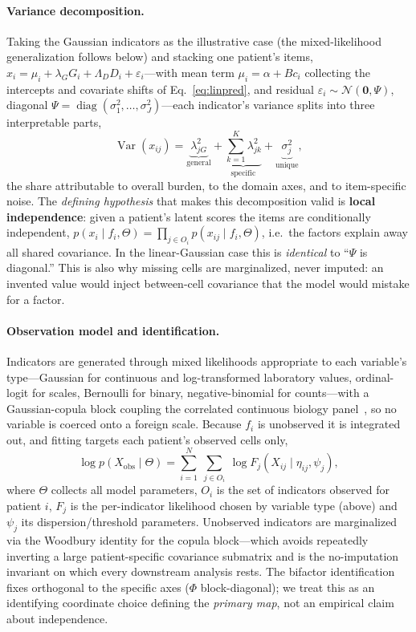 \paragraph{Variance decomposition.} Taking the Gaussian indicators as the illustrative case (the
mixed-likelihood generalization follows below) and stacking one patient's items, $x_i=\mu_i+\lambda_G
G_i+\Lambda_D D_i+\varepsilon_i$---with mean term $\mu_i=\alpha+Bc_i$ collecting the intercepts and
covariate shifts of Eq.~\ref{eq:linpred}, and residual $\varepsilon_i\sim\mathcal N(\mathbf 0,\Psi)$,
diagonal $\Psi=\operatorname{diag}(\sigma_1^2,\dots,\sigma_J^2)$---each indicator's variance splits into
three interpretable parts,
\begin{equation}
\operatorname{Var}(x_{ij})=\underbrace{\lambda_{jG}^{2}}_{\text{general}}
+\underbrace{\textstyle\sum_{k=1}^{K}\lambda_{jk}^{2}}_{\text{specific}}
+\underbrace{\sigma_j^{2}}_{\text{unique}} ,
\label{eq:vardecomp}
\end{equation}
the share attributable to overall burden, to the domain axes, and to item-specific noise. The
\emph{defining hypothesis} that makes this decomposition valid is \textbf{local independence}: given a
patient's latent scores the items are conditionally independent,
$p(x_i\mid f_i,\Theta)=\prod_{j\in O_i}p(x_{ij}\mid f_i,\Theta)$, i.e.\ the factors explain away all
shared covariance. In the linear-Gaussian case this is \emph{identical} to ``$\Psi$ is diagonal.''
This is also why missing cells are marginalized, never imputed: an invented value would inject
between-cell covariance that the model would mistake for a factor.

\paragraph{Observation model and identification.} Indicators are generated through mixed likelihoods
appropriate to each variable's type---Gaussian for continuous and log-transformed laboratory values,
ordinal-logit for scales, Bernoulli for binary, negative-binomial for counts---with a Gaussian-copula
block coupling the correlated continuous biology panel~\citep{hui2017gllvm}, so no variable is coerced
onto a foreign scale. Because $f_i$ is unobserved it is integrated out, and fitting targets each
patient's observed cells only,
\begin{equation}
\log p\!\left(X_{\mathrm{obs}}\mid\Theta\right)=\sum_{i=1}^{N}\ \sum_{j\in O_i}\
\log F_j\!\left(X_{ij}\mid\eta_{ij},\psi_j\right),
\label{eq:obslik}
\end{equation}
where $\Theta$ collects all model parameters, $O_i$ is the set of indicators observed for patient $i$,
$F_j$ is the per-indicator likelihood chosen by variable type (above) and $\psi_j$ its
dispersion/threshold parameters. Unobserved indicators are marginalized via the Woodbury identity for
the copula block---which avoids repeatedly inverting a large patient-specific covariance submatrix and
is the
no-imputation invariant on which every downstream analysis rests. The bifactor identification fixes
\Gfac{} orthogonal to the specific axes ($\Phi$ block-diagonal); we treat this as an identifying
coordinate choice defining the \emph{primary map}, not an empirical claim about independence.


